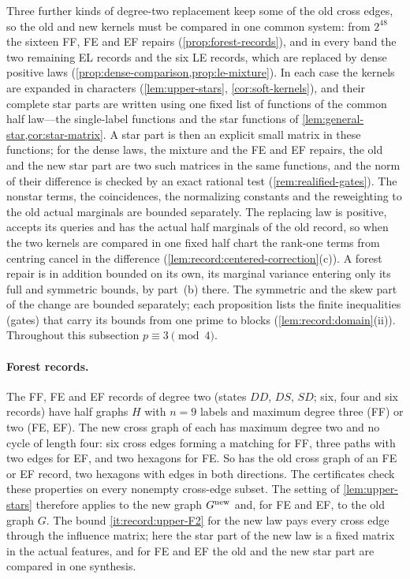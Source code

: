 Three further kinds of degree-two replacement keep some of the
old cross edges, so the old and new kernels must be compared in
one common system: from $2^{48}$ the sixteen FF, FE and EF repairs
(\cref{prop:forest-records}), and in every band the two remaining
EL records and the six LE records, which are replaced by dense
positive laws
(\cref{prop:dense-comparison,prop:le-mixture}). In each case the
kernels are expanded in characters
(\cref{lem:upper-stars}, \cref{cor:soft-kernels}), and their
complete star parts are written using one fixed list of functions
of the common half law---the single-label functions and the star
functions of \cref{lem:general-star,cor:star-matrix}. A star part
is then an explicit small matrix in these functions; for the dense
laws, the mixture and the FE and EF repairs, the old and the new
star part are two such matrices in the same functions, and the
norm of their difference is checked by an exact rational test
(\cref{rem:realified-gates}). The nonstar terms, the coincidences,
the normalizing constants and the reweighting to the old actual
marginals are bounded separately. The replacing law is positive,
accepts its queries and has the actual half marginals of the old
record, so when the two kernels are compared in one fixed half
chart the rank-one terms from centring cancel in the difference
(\cref{lem:record:centered-correction}(c)). A forest repair is in
addition bounded on its own, its marginal variance entering only
its full and symmetric bounds, by part~(b) there. The symmetric and the
skew part of the change are bounded separately; each proposition
lists the finite inequalities (gates) that carry its bounds from
one prime to blocks (\cref{lem:record:domain}(ii)). Throughout
this subsection $p\equiv3\pmod4$.

\paragraph{Forest records.}
The FF, FE and EF records of degree two (states $DD$, $DS$, $SD$; six, four and
six records) have half graphs $H$ with $n=9$ labels and maximum degree three
(FF) or two (FE, EF). The new cross graph of each has maximum degree two and no
cycle of length four: six cross edges forming a matching for FF, three paths with
two edges for EF, and two hexagons for FE. So has the old cross graph of an FE or
EF record, two hexagons with edges in both directions. The certificates check
these properties on every nonempty cross-edge subset. The setting of
\cref{lem:upper-stars} therefore applies to the new graph $G^{\rm new}$ and, for
FE and EF, to the old graph $G$. The bound \ref{it:record:upper-F2} for the new
law pays every cross edge through the influence matrix; here the star part of
the new law is a fixed matrix in the actual features, and for FE and EF the old
and the new star part are compared in one synthesis.

